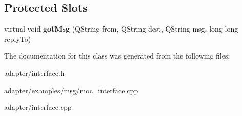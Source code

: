 \subsection*{Protected Slots}
\begin{DoxyCompactItemize}
\item 
\hypertarget{classIMFramework_1_1Presence_ab219d4d88b2b0ba5d7740138e8f350e2}{
virtual void {\bfseries gotMsg} (QString from, QString dest, QString msg, long long replyTo)}
\label{classIMFramework_1_1Presence_ab219d4d88b2b0ba5d7740138e8f350e2}

\end{DoxyCompactItemize}


The documentation for this class was generated from the following files:\begin{DoxyCompactItemize}
\item 
adapter/interface.h\item 
adapter/examples/msg/moc\_\-interface.cpp\item 
adapter/interface.cpp\end{DoxyCompactItemize}
